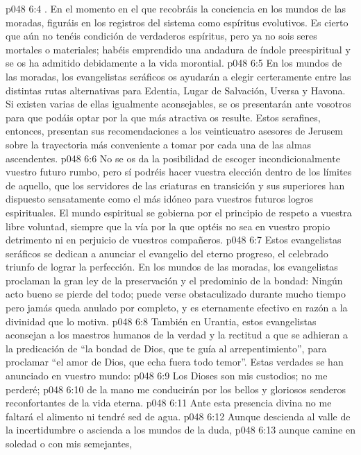 \vs p048 6:4 . En el momento en el que recobráis la conciencia en los mundos de las moradas, figuráis en los registros del sistema como espíritus evolutivos. Es cierto que aún no tenéis condición de verdaderos espíritus, pero ya no sois seres mortales o materiales; habéis emprendido una andadura de índole preespiritual y se os ha admitido debidamente a la vida morontial.
\vs p048 6:5 En los mundos de las moradas, los evangelistas seráficos os ayudarán a elegir certeramente entre las distintas rutas alternativas para Edentia, Lugar de Salvación, Uversa y Havona. Si existen varias de ellas igualmente aconsejables, se os presentarán ante vosotros para que podáis optar por la que más atractiva os resulte. Estos serafines, entonces, presentan sus recomendaciones a los veinticuatro asesores de Jerusem sobre la trayectoria más conveniente a tomar por cada una de las almas ascendentes.
\vs p048 6:6 No se os da la posibilidad de escoger incondicionalmente vuestro futuro rumbo, pero sí podréis hacer vuestra elección dentro de los límites de aquello, que los servidores de las criaturas en transición y sus superiores han dispuesto sensatamente como el más idóneo para vuestros futuros logros espirituales. El mundo espiritual se gobierna por el principio de respeto a vuestra libre voluntad, siempre que la vía por la que optéis no sea en vuestro propio detrimento ni en perjuicio de vuestros compañeros.
\vs p048 6:7 \pc Estos evangelistas seráficos se dedican a anunciar el evangelio del eterno progreso, el celebrado triunfo de lograr la perfección. En los mundos de las moradas, los evangelistas proclaman la gran ley de la preservación y el predominio de la bondad: Ningún acto bueno se pierde del todo; puede verse obstaculizado durante mucho tiempo pero jamás queda anulado por completo, y es eternamente efectivo en razón a la divinidad que lo motiva.
\vs p048 6:8 También en Urantia, estos evangelistas aconsejan a los maestros humanos de la verdad y la rectitud a que se adhieran a la predicación de “la bondad de Dios, que te guía al arrepentimiento”, para proclamar “el amor de Dios, que echa fuera todo temor”. Estas verdades se han anunciado en vuestro mundo:
\vs p048 6:9 Los Dioses son mis custodios; no me perderé;
\vs p048 6:10 de la mano me conducirán por los bellos y gloriosos senderos reconfortantes de la vida eterna.
\vs p048 6:11 Ante esta presencia divina no me faltará el alimento ni tendré sed de agua.
\vs p048 6:12 Aunque descienda al valle de la incertidumbre o ascienda a los mundos de la duda,
\vs p048 6:13 aunque camine en soledad o con mis semejantes,
